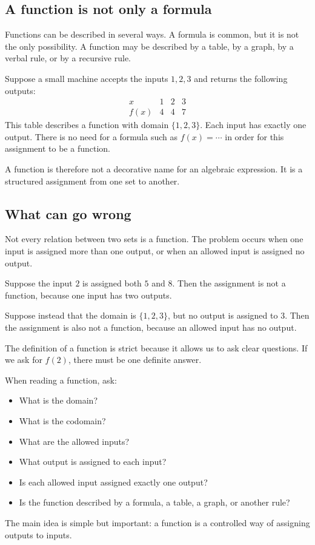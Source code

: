 \subsection*{A function is not only a formula}

Functions can be described in several ways. A formula is common, but it is not the only possibility. A function may be described by a table, by a graph, by a verbal rule, or by a recursive rule.

\begin{examplebox}
Suppose a small machine accepts the inputs \(1,2,3\) and returns the following outputs:
\[
\begin{array}{c|ccc}
x & 1 & 2 & 3\\
\hline
f(x) & 4 & 4 & 7
\end{array}
\]
This table describes a function with domain \(\{1,2,3\}\). Each input has exactly one output. There is no need for a formula such as \(f(x)=\cdots\) in order for this assignment to be a function.
\end{examplebox}

A function is therefore not a decorative name for an algebraic expression. It is a structured assignment from one set to another.

\subsection*{What can go wrong}

Not every relation between two sets is a function. The problem occurs when one input is assigned more than one output, or when an allowed input is assigned no output.

\begin{examplebox}
Suppose the input \(2\) is assigned both \(5\) and \(8\). Then the assignment is not a function, because one input has two outputs.

Suppose instead that the domain is \(\{1,2,3\}\), but no output is assigned to \(3\). Then the assignment is also not a function, because an allowed input has no output.
\end{examplebox}

The definition of a function is strict because it allows us to ask clear questions. If we ask for \(f(2)\), there must be one definite answer.

\begin{summarybox}
When reading a function, ask:
\begin{itemize}
\item What is the domain?
\item What is the codomain?
\item What are the allowed inputs?
\item What output is assigned to each input?
\item Is each allowed input assigned exactly one output?
\item Is the function described by a formula, a table, a graph, or another rule?
\end{itemize}
\end{summarybox}

The main idea is simple but important: a function is a controlled way of assigning outputs to inputs.